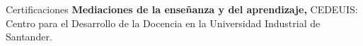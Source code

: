 \begin{rubric}{Certificaciones}
\entry*[2022] \textbf{Mediaciones de la enseñanza y del aprendizaje,} CEDEUIS: Centro para el Desarrollo de la Docencia en la Universidad Industrial de Santander.
\end{rubric}